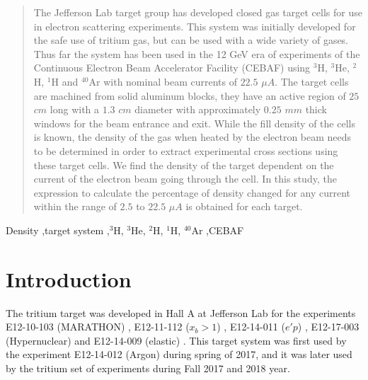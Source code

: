 \documentclass[final,5p,times,twocolumn,balance]{elsarticle}
\begin{document}
\begin{frontmatter}
\begin{abstract}
The Jefferson Lab target group has developed closed gas target cells for use in electron scattering experiments. This system was initially developed for the safe use of tritium gas, but can be used with a wide variety of gases.  Thus far the system has been used in the 12 GeV 
era of experiments of the Continuous Electron Beam Accelerator Facility (CEBAF) using $^{3}$H, $^{3}$He, $^{2}$H, $^{1}$H and $^{40}$Ar with nominal beam currents of  $22.5$ $\mu A$.  The target cells are machined from solid  aluminum blocks, they have an active region of $25$ $cm$ long with a $1.3$ $cm$ diameter with approximately $0.25$ $mm$ thick windows for the beam entrance and exit.   While the fill density of the cells is known, the density of the gas when heated by the electron beam needs to be determined in order to extract experimental cross sections using these target cells. We find the density of the target dependent on the current of the electron beam going through the cell. In this study, the expression to calculate the percentage of density changed for any current within the range of $2.5$ to $22.5$ $\mu A$ is obtained for each target.
 


  
\end{abstract}

\begin{keyword}
Density \sep target system
\sep $^{3}$H, $^{3}$He, $^{2}$H, $^{1}$H, $^{40}$Ar
\sep CEBAF
\end{keyword}
\end{frontmatter}


\section{Introduction}
\label{}

The tritium target was developed in Hall A at Jefferson Lab for the experiments E12-10-103 (MARATHON) \cite{marathon}, E12-11-112 ($x_{b}>1$) \cite{E12-11-112}, E12-14-011 ($e'p$) \cite{E12-14-011}, E12-17-003 (Hypernuclear) \cite{hypernuclear} and E12-14-009 (elastic) \cite{E12-14-009}. This target system was first used by the experiment E12-14-012 (Argon) \cite{E12-14-012} during spring of 2017, and it was later used by the tritium set of experiments during  Fall 2017 and  2018 year. 
\end{document}
